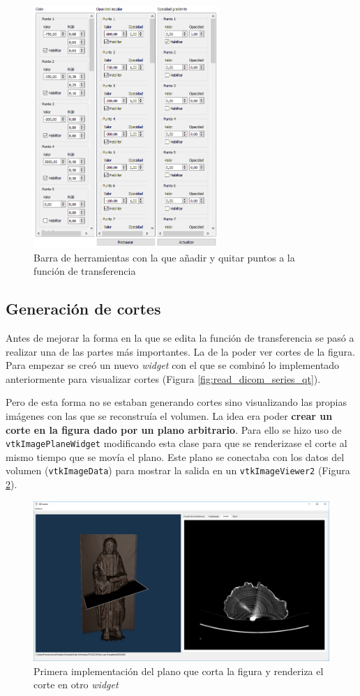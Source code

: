 \begin{figure}[H]
	\centering
	\includegraphics[width=7cm]{imagenes/gui_inicial_tf}
	\caption{Barra de herramientas con la que añadir y quitar puntos a la función de transferencia}
	\label{fig:gui_inicial_tf}
\end{figure}

\subsection{Generación de cortes}

Antes de mejorar la forma en la que se edita la función de transferencia se pasó a realizar una de las partes más importantes. La de la poder ver cortes de la figura. Para empezar se creó un nuevo \textit{widget} con el que se combinó lo implementado anteriormente para visualizar cortes (Figura \ref{fig:read_dicom_series_qt}). 

Pero de esta forma no se estaban generando cortes sino visualizando las propias imágenes con las que se reconstruía el volumen. La idea era poder \textbf{crear un corte en la figura dado por un plano arbitrario}. Para ello se hizo uso de \texttt{vtkImagePlaneWidget} modificando esta clase para que se renderizase el corte al mismo tiempo que se movía el plano. Este plano se conectaba con los datos del volumen (\texttt{vtkImageData}) para mostrar la salida en un \texttt{vtkImageViewer2} (Figura \ref{fig:primer_plano_de_corte}).

\begin{figure}[H]
	\centering
	\includegraphics[width=12cm]{imagenes/primer_plano_de_corte}
	\caption{Primera implementación del plano que corta la figura y renderiza el corte en otro \textit{widget}}
	\label{fig:primer_plano_de_corte}
\end{figure}

